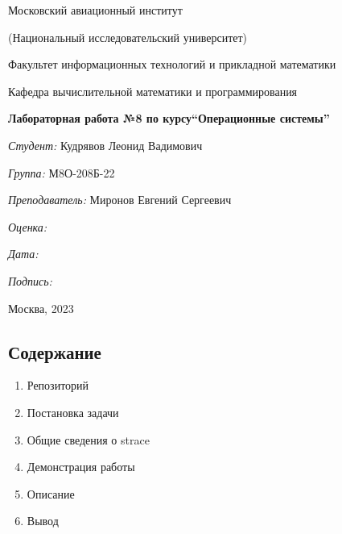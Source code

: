 \documentclass[a4paper, 14pt]{article}
\begin{document}
\thispagestyle{empty}	
\begin{center}
	Московский авиационный институт
	
	(Национальный исследовательский университет)
	
	Факультет информационных технологий и прикладной математики
	
	Кафедра вычислительной математики и программирования
	
\end{center}
\vspace{40ex}
\begin{center}
	\textbf{\large{Лабораторная работа №8 по курсу\linebreak \textquotedblleft Операционные системы\textquotedblright}}
\end{center}
\vspace{35ex}
\begin{flushright}
	\textit{Студент: } Кудрявов Леонид Вадимович
	
	\vspace{2ex}
	\textit{Группа: } М8О-208Б-22
	
	\vspace{2ex}
	\textit{Преподаватель: } Миронов Евгений Сергеевич
	
	\vspace{2ex}
	\textit{Оценка: } \underline{\quad\quad\quad\quad\quad\quad}
	
	 \vspace{2ex}
	\textit{Дата: } \underline{\quad\quad\quad\quad\quad\quad}
	
	\vspace{2ex}
	\textit{Подпись: } \underline{\quad\quad\quad\quad\quad\quad}
	
\end{flushright}

\vspace{5ex}

\begin{vfill}
	\begin{center}
		Москва, 2023
	\end{center}	
\end{vfill}
\newpage

\begin{center}
\section*{Содержание}   
\end{center}
\vspace{5ex}
\begin{enumerate}
  \item Репозиторий
  \item Постановка задачи
  \item Общие сведения о strace
  \item Демонстрация работы
  \item Описание
  \item Вывод
\end{enumerate}
\newpage
\end{document}
